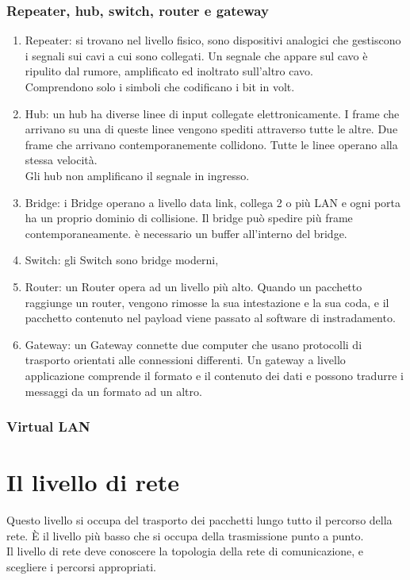 \documentclass{article}
\begin{document}
\subsubsection{Repeater, hub, switch, router e gateway}
\begin{enumerate}
\item Repeater: si trovano nel livello fisico, sono dispositivi analogici che gestiscono i segnali sui cavi a cui sono collegati. Un segnale che appare sul cavo è ripulito dal rumore, amplificato ed inoltrato sull'altro cavo.\\
Comprendono solo i simboli che codificano i bit in volt.
\item Hub: un hub ha diverse linee di input collegate elettronicamente. I frame che arrivano su una di queste linee vengono spediti attraverso tutte le altre. Due frame che arrivano contemporanemente collidono. Tutte le linee operano alla stessa velocità.\\
Gli hub non amplificano il segnale in ingresso. 
\item Bridge: i Bridge operano a livello data link, collega 2 o più LAN e ogni porta ha un proprio dominio di collisione. Il bridge può spedire più frame contemporaneamente. 
è necessario un buffer all'interno del bridge. 
\item Switch: gli Switch sono bridge moderni, 
\item Router: un Router opera ad un livello più alto. Quando un pacchetto raggiunge un router, vengono rimosse la sua intestazione e la sua coda, e il pacchetto contenuto nel payload viene passato al software di instradamento. 
\item Gateway: un Gateway connette due computer che usano protocolli di trasporto orientati alle connessioni differenti. Un gateway a livello applicazione comprende il formato e il contenuto dei dati e possono tradurre i messaggi da un formato ad un altro.
\end{enumerate}
\subsubsection{Virtual LAN}

\newpage
\section{Il livello di rete}
Questo livello si occupa del trasporto dei pacchetti lungo tutto il percorso della rete. È il livello più basso che si occupa della trasmissione punto a punto. \\
Il livello di rete deve conoscere la topologia della rete di comunicazione, e scegliere i percorsi appropriati.
\end{document}
